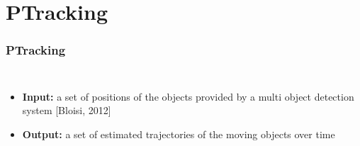 \section{PTracking}

\begin{frame}
	\frametitle{PTracking}
	
	\vspace{0.15cm}
	
	\begin{columns}[T]
		
		\vspace{0.8cm}
		
		\begin{itemize}
			\item \textbf{Input:} a set of positions of the objects provided by a multi
				  object detection system [Bloisi, 2012]
			
			\vspace{1.6cm}
			
			\item \textbf{Output:} a set of estimated trajectories of the moving objects
				  over time
		\end{itemize}
		
		\centering
		
	\end{columns}
\end{frame}

